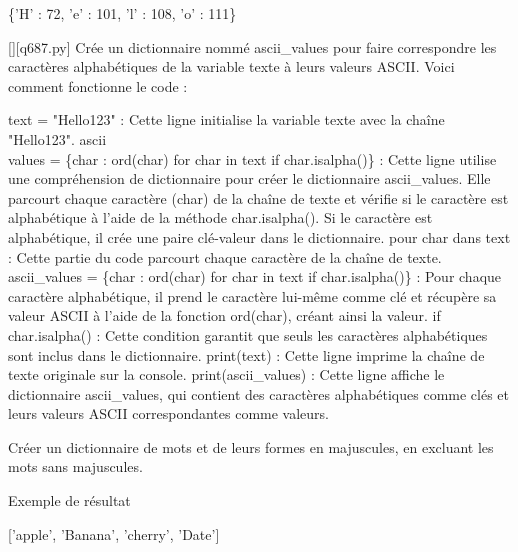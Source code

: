\{'H' : 72, 'e' : 101, 'l' : 108, 'o' : 111\}
        \par
        \begin{solution}
            \renewcommand{\nomfichier}{q687.py}
            \pythonfile{\chemincode \nomfichier}[][\nomfichier]
            Crée un dictionnaire nommé ascii\_values pour faire correspondre les caractères alphabétiques de la variable texte à leurs valeurs ASCII. Voici comment fonctionne le code :

    text = "Hello123" : Cette ligne initialise la variable texte avec la chaîne "Hello123".
    ascii\\values = \{char : ord(char) for char in text if char.isalpha()\} : Cette ligne utilise une compréhension de dictionnaire pour créer le dictionnaire ascii\_values. Elle parcourt chaque caractère (char) de la chaîne de texte et vérifie si le caractère est alphabétique à l'aide de la méthode char.isalpha(). Si le caractère est alphabétique, il crée une paire clé-valeur dans le dictionnaire.
        pour char dans text : Cette partie du code parcourt chaque caractère de la chaîne de texte.
        ascii\_values = \{char : ord(char) for char in text if char.isalpha()\} : Pour chaque caractère alphabétique, il prend le caractère lui-même comme clé et récupère sa valeur ASCII à l'aide de la fonction ord(char), créant ainsi la valeur.
        if char.isalpha() : Cette condition garantit que seuls les caractères alphabétiques sont inclus dans le dictionnaire.
    print(text) : Cette ligne imprime la chaîne de texte originale sur la console.
    print(ascii\_values) : Cette ligne affiche le dictionnaire ascii\_values, qui contient des caractères alphabétiques comme clés et leurs valeurs ASCII correspondantes comme valeurs.
        \end{solution}
        

        \question
        Créer un dictionnaire de mots et de leurs formes en majuscules, en excluant les mots sans majuscules.

Exemple de résultat

['apple', 'Banana', 'cherry', 'Date']

